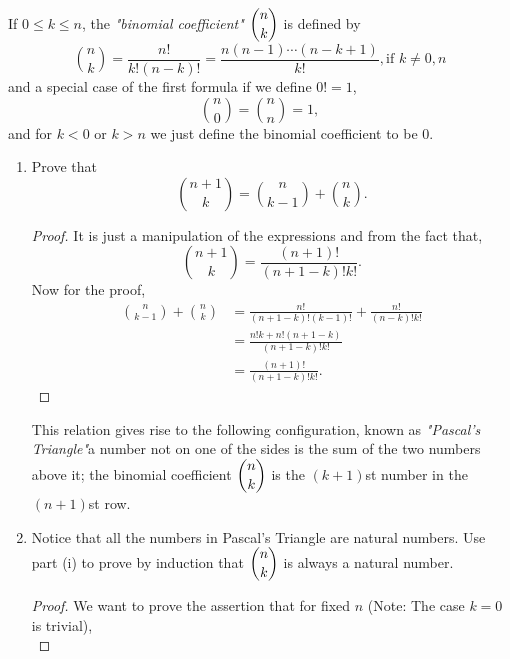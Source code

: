 \pagebreak
\begin{exercise}[\textbf{3}] If $0\leq k \leq n$, the \emph{"binomial
    coefficient"} $\dbinom{n}{k}$ is defined by 
    \begin{equation*}
        \binom{n}{k} = \frac{n!}{k!(n-k)!} = \frac{n(n-1)\dotsb (n-k+1)}{k!}, \text{if }k\neq 0, n 
    \end{equation*}
     and a special case of the first formula if we define $0!=1$,
     \begin{equation*}
         \binom{n}{0}=\binom{n}{n}=1,
     \end{equation*}    
     and for $k<0$ or $k>n$ we just define the binomial coefficient to be $0$.
     \begin{enumerate}
         \item Prove that
         \begin{equation*}
             \binom{n+1}{k}=\binom{n}{k-1}+\binom{n}{k}.
         \end{equation*}
         \begin{proof} It is just a manipulation of the expressions and from the fact that,
            \begin{equation*}
                \binom{n+1}{k} = \frac{(n+1)!}{(n+1-k)!k!}.
            \end{equation*}
            Now for the proof,
              \begin{align*}
                \binom{n}{k-1}+\binom{n}{k} &= \frac{n!}{(n+1-k)!(k-1)!} +\frac{n!}{(n-k)!k!}\\
                  &= \frac{n!k+n!(n+1-k)}{(n+1-k)!k!} \\
                  &= \frac{(n+1)!}{(n+1-k)!k!}.
              \end{align*}
         \end{proof}
         This relation gives rise to the following configuration, known as
         \emph{"Pascal's Triangle"}\textemdash  a number not on one of the sides
         is the sum of the two numbers above it; the binomial coefficient
         $\dbinom{n}{k}$ is the $(k+1)$st number in the $(n+1)$st row.
         \item Notice that all the numbers in Pascal's Triangle are natural
         numbers. Use part (i) to prove by induction that $\dbinom{n}{k}$ is
         always a natural number.
         \begin{proof} We want to prove the assertion that for fixed $n$ (Note: The case $k=0$ is trivial),
            \begin{equation*}

\end{equation*}
\end{proof}
\end{enumerate}
\end{exercise}
